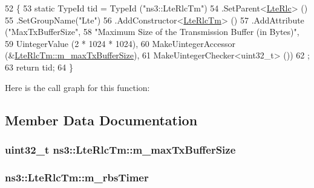 \begin{DoxyCode}
52 \{
53   \textcolor{keyword}{static} TypeId tid = TypeId (\textcolor{stringliteral}{"ns3::LteRlcTm"})
54     .SetParent<\hyperlink{classns3_1_1LteRlc_a7204bd3f846a0f5d8c620cad57eceffd}{LteRlc}> ()
55     .SetGroupName(\textcolor{stringliteral}{"Lte"})
56     .AddConstructor<\hyperlink{classns3_1_1LteRlcTm_a9f887c7a65a4ca372437ada28c6cae03}{LteRlcTm}> ()
57     .AddAttribute (\textcolor{stringliteral}{"MaxTxBufferSize"},
58                    \textcolor{stringliteral}{"Maximum Size of the Transmission Buffer (in Bytes)"},
59                    UintegerValue (2 * 1024 * 1024),
60                    MakeUintegerAccessor (&\hyperlink{classns3_1_1LteRlcTm_abf75ac152a0470e0f66d13a1d864a147}{LteRlcTm::m\_maxTxBufferSize}),
61                    MakeUintegerChecker<uint32\_t> ())
62     ;
63   \textcolor{keywordflow}{return} tid;
64 \}
\end{DoxyCode}


Here is the call graph for this function\+:




\subsection{Member Data Documentation}
\subsubsection[{\texorpdfstring{m\+\_\+max\+Tx\+Buffer\+Size}{m_maxTxBufferSize}}]{\setlength{\rightskip}{0pt plus 5cm}uint32\+\_\+t ns3\+::\+Lte\+Rlc\+Tm\+::m\+\_\+max\+Tx\+Buffer\+Size\hspace{0.3cm}{\ttfamily [private]}}\hypertarget{classns3_1_1LteRlcTm_abf75ac152a0470e0f66d13a1d864a147}{}\label{classns3_1_1LteRlcTm_abf75ac152a0470e0f66d13a1d864a147}
\subsubsection[{\texorpdfstring{m\+\_\+rbs\+Timer}{m_rbsTimer}}]{ ns3\+::\+Lte\+Rlc\+Tm\+::m\+\_\+rbs\+Timer\hspace{0.3cm}{\ttfamily [private]}}\hypertarget{classns3_1_1LteRlcTm_a8d10d7af1d0897e6bc82d892d8b87749}{}\label{classns3_1_1LteRlcTm_a8d10d7af1d0897e6bc82d892d8b87749}
